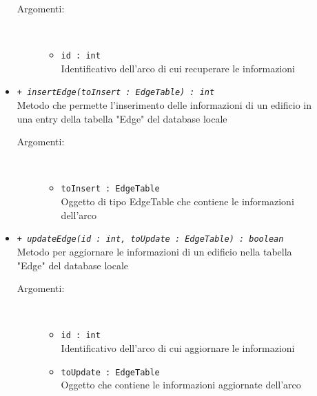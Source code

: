 \documentclass[../DefinizioneDiProdotto.tex]{subfiles}
\begin{document}
\begin{description}
\begin{itemize}
\begin{description}
			\item[Argomenti:] \
			\begin{itemize}
				\item \texttt{id : int}\\
				Identificativo dell'arco di cui recuperare le informazioni\end{itemize}
		\end{description}
		\item \texttt{+ \textit{insertEdge(toInsert : EdgeTable) : int}}\\
		Metodo che permette l'inserimento delle informazioni di un edificio in una entry della tabella "Edge" del database locale
		\begin{description}
			\item[Argomenti:] \
			\begin{itemize}
				\item \texttt{toInsert : EdgeTable}\\
				Oggetto di tipo EdgeTable che contiene le informazioni dell'arco\end{itemize}
		\end{description}
		\item \texttt{+ \textit{updateEdge(id : int, toUpdate : EdgeTable) : boolean}}\\
		Metodo per aggiornare le informazioni di un edificio nella tabella "Edge" del database locale
		\begin{description}
			\item[Argomenti:] \
			\begin{itemize}
				\item \texttt{id : int}\\
				Identificativo dell'arco di cui aggiornare le informazioni\item \texttt{toUpdate : EdgeTable}\\
				Oggetto che contiene le informazioni aggiornate dell'arco\end{itemize}
		\end{description}
	\end{itemize}
\end{description}
\end{document}

